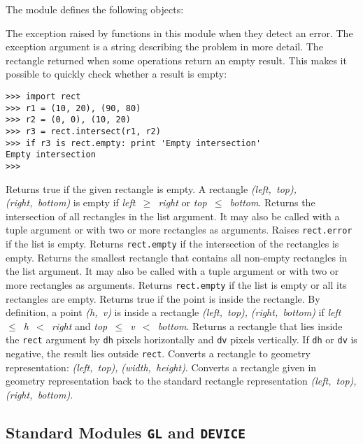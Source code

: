 The module defines the following objects:
\begin{description}
The exception raised by functions in this module when they detect an
error.
The exception argument is a string describing the problem in more
detail.
The rectangle returned when some operations return an empty result.
This makes it possible to quickly check whether a result is empty:
\bcode\begin{verbatim}
>>> import rect
>>> r1 = (10, 20), (90, 80)
>>> r2 = (0, 0), (10, 20)
>>> r3 = rect.intersect(r1, r2)
>>> if r3 is rect.empty: print 'Empty intersection'
Empty intersection
>>> 
\end{verbatim}\ecode
{}
Returns true if the given rectangle is empty.
A rectangle
{\em (left,~top), (right,~bottom)}
is empty if
{\em left~$\geq$~right}
or
{\em top~$\leq$~bottom}.
Returns the intersection of all rectangles in the list argument.
It may also be called with a tuple argument or with two or more
rectangles as arguments.
Raises
{\tt rect.error}
if the list is empty.
Returns
{\tt rect.empty}
if the intersection of the rectangles is empty.
Returns the smallest rectangle that contains all non-empty rectangles in
the list argument.
It may also be called with a tuple argument or with two or more
rectangles as arguments.
Returns
{\tt rect.empty}
if the list is empty or all its rectangles are empty.
Returns true if the point is inside the rectangle.
By definition, a point
{\em (h,~v)}
is inside a rectangle
{\em (left,~top),}
{\em (right,~bottom)}
if
{\em left~$\leq$~h~$<$~right}
and
{\em top~$\leq$~v~$<$~bottom}.
Returns a rectangle that lies inside the
{\tt rect}
argument by
{\tt dh}
pixels horizontally
and
{\tt dv}
pixels
vertically.
If
{\tt dh}
or
{\tt dv}
is negative, the result lies outside
{\tt rect}.
Converts a rectangle to geometry representation:
{\em (left,~top),}
{\em (width,~height)}.
Converts a rectangle given in geometry representation back to the
standard rectangle representation
{\em (left,~top),}
{\em (right,~bottom)}.
\end{description}

\subsection{Standard Modules {\tt GL} and {\tt DEVICE}}

